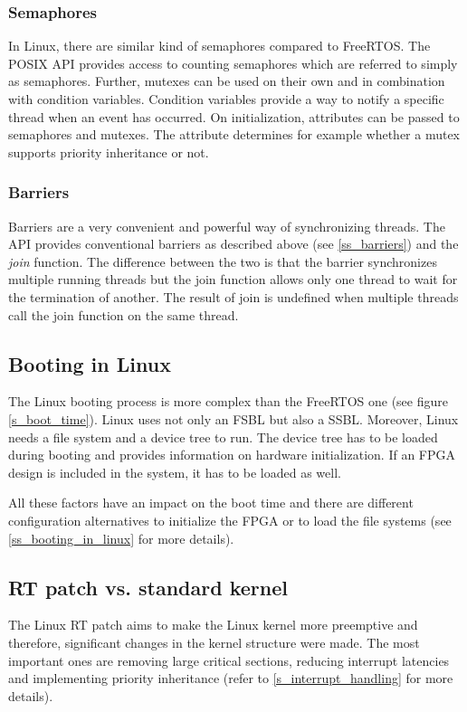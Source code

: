 \subsubsection{Semaphores}
In Linux, there are similar kind of semaphores compared to FreeRTOS.
The \ac{POSIX} \ac{API} provides access to counting semaphores which are referred to simply as semaphores.
Further, mutexes can be used on their own and in combination with condition variables.
Condition variables provide a way to notify a specific thread when an event has occurred. 
On initialization, attributes can be passed to semaphores and mutexes.
The attribute determines for example whether a mutex supports priority inheritance or not.

\subsubsection{Barriers}
Barriers are a very convenient and powerful way of synchronizing threads. 
The \ac{API} provides conventional barriers as described above (see \ref{ss_barriers}) and the \textit{join} function.
The difference between the two is that the barrier synchronizes multiple running threads but the join function allows only one thread to wait for the termination of another.
The result of join is undefined when multiple threads call the join function on the same thread.

\subsection{Booting in Linux}
The Linux booting process is more complex than the FreeRTOS one (see figure \ref{s_boot_time}). 
Linux uses not only an \ac{FSBL} but also a \ac{SSBL}.
Moreover, Linux needs a file system and a device tree to run.
The device tree has to be loaded during booting and provides information on hardware initialization.
If an \ac{FPGA} design is included in the system, it has to be loaded as well.
\par
All these factors have an impact on the boot time and there are different configuration alternatives to initialize the \ac{FPGA} or to load the file systems (see \ref{ss_booting_in_linux} for more details). 

\subsection{RT patch vs. standard kernel}
The Linux RT patch aims to make the Linux kernel more preemptive and therefore, significant changes in the kernel structure were made.
The most important ones are removing large critical sections, reducing interrupt latencies and implementing priority inheritance (refer to \ref{s_interrupt_handling} for more details).

